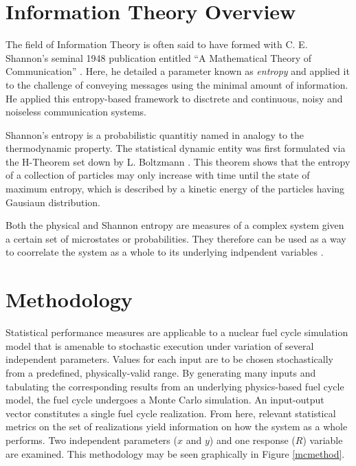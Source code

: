 \documentclass[a4paper, 12pt]{article}
\begin{document}
\section{Information Theory Overview}
\label{sec:it-overview}

The field of Information Theory is often said to have formed with C. E. Shannon's seminal 1948 publication 
entitled ``A Mathematical Theory of Communication'' \cite{Shannon1948}.  Here, he detailed a parameter 
known as \emph{entropy} and applied it to the challenge of conveying messages using the minimal 
amount of information.  He applied this entropy-based framework to disctrete and continuous, noisy and noiseless 
communication systems.

Shannon's entropy is a probabilistic quantitiy named in analogy to the thermodynamic property.
The statistical dynamic entity was first formulated via the H-Theorem set down by L. Boltzmann 
\cite{Boltzmann1872}.  This theorem shows that the entropy of a collection of particles 
may only increase with time until the state of maximum entropy, which is described by a 
kinetic energy of the particles having Gausiaun distribution.  

Both the physical and Shannon entropy are measures of a complex system given a certain set of 
microstates or probabilities.  They therefore can be used as a way to coorrelate the system 
as a whole to its underlying indpendent variables \cite{Watanabe1960}.



\section{Methodology}
\label{sec:methodology}

Statistical performance measures are applicable to a nuclear fuel cycle simulation model that
is amenable to stochastic execution under variation of several independent parameters.  Values
for each input are to be chosen stochastically from a predefined, physically-valid range.
By generating many inputs and tabulating the corresponding results from an underlying physics-based
fuel cycle model, the fuel cycle undergoes a Monte Carlo simulation.  An input-output vector
constitutes a single fuel cycle realization.  From here, relevant statistical metrics on the set of
realizations yield information on how the system as a whole performs.  
Two independent parameters ($x$ and $y$) and one response ($R$) variable are examined.
This methodology may be seen graphically in Figure \ref{mcmethod}.
\end{document}
